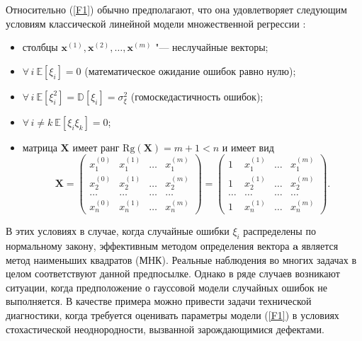 Относительно (\ref{F1}) обычно предполагают, что она удовлетворяет следующим условиям   классической
линейной модели множественной регрессии {\cite{first}}:

\begin{itemize}
\item[$1^{\circ}$)] столбцы $\mathbf{x}^{(1)}, \mathbf{x}^{(2)}, \ldots, \mathbf{x}^{(m)}$ "--- неслучайные векторы;

\item[$2^{\circ}$)] $\forall \, i ~ \mathbb{E}[\xi_{i}]=0$  (математическое ожидание ошибок равно нулю);

\item[$3^{\circ}$)] $\forall \, i ~ \mathbb{E}[\xi_{i}^{2}]=\mathbb{D}[\xi_{i}]=\sigma_{\xi}^{2}$ (гомоскедастичность ошибок);

\item[$4^{\circ}$)] $\forall \, i \neq k ~ \mathbb{E}[\xi_{i}\xi_{k}]=0$;

\item[$5^{\circ}$)] матрица $\mathbf{X}$ имеет ранг
$\mathrm{Rg}(\mathbf{X}) = m + 1 < n$ и имеет вид $$
\mathbf{X}=\left(\begin{array}{cccc} x_{1}^{(0)} & x_{1}^{(1)} &
\ldots & x_{1}^{(m)}\\ x_{2}^{(0)} & x_{2}^{(1)} & \ldots &
x_{2}^{(m)}\\ \ldots & \ldots & \ldots & \ldots\\ x_{n}^{(0)} &
x_{n}^{(1)} & \ldots & x_{n}^{(m)}\end{array}\right) =
\left(\begin{array}{cccc} 1 & x_{1}^{(1)} & \ldots & x_{1}^{(m)}\\
1 & x_{2}^{(1)} & \ldots & x_{2}^{(m)}\\ \ldots & \ldots & \ldots
& \ldots\\ 1 & x_{n}^{(1)} & \ldots &
x_{n}^{(m)}\end{array}\right). $$
\end{itemize}

В этих условиях в случае, когда случайные ошибки $\xi_{i}$
распределены по нормальному закону, эффективным методом
определения вектора $\mathbf{a}$ является метод наименьших
квадратов (МНК). Реальные наблюдения во многих задачах в целом
соответствуют данной предпосылке. Однако в ряде случаев возникают
ситуации, когда предположение о гауссовой модели случайных ошибок
не выполняется. 
В качестве примера можно привести задачи
технической диагностики, когда требуется оценивать параметры
модели (\ref{F1}) в условиях стохастической неоднородности,
вызванной зарождающимися дефектами.

